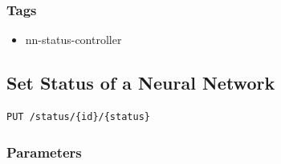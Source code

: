 \subsubsection{Tags}\label{tags-11}

\begin{itemize}
\tightlist
\item
  nn-status-controller
\end{itemize}

\subsection{Set Status of a Neural
Network}\label{set-status-of-a-neural-network}

\begin{verbatim}
PUT /status/{id}/{status}
\end{verbatim}

\subsubsection{Parameters}\label{parameters-10}

